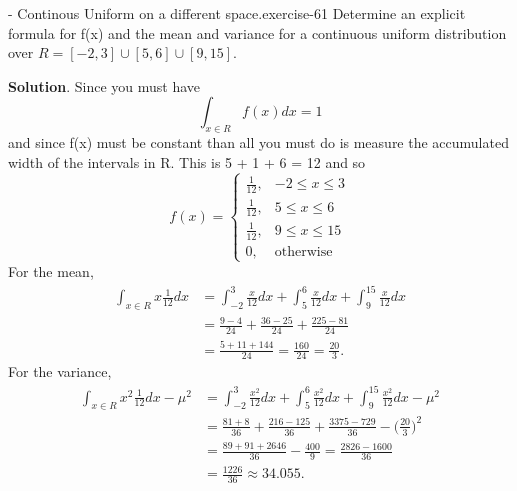\documentclass[10pt,]{book}
\numberwithin{equation}{section}
\begin{document}
%
\par
\hypertarget{p-879}{}%
\begin{inlineexercise}{- Continous Uniform on a different space.}{exercise-61}%
\hypertarget{p-880}{}%
Determine an explicit formula for f(x) and the mean and variance for a continuous uniform distribution over \(R = [-2,3] \cup [5,6] \cup [9,15]\).%
\par\smallskip%
\noindent\textbf{Solution}.\hypertarget{solution-26}{}\quad%
\hypertarget{p-881}{}%
Since you must have%
\begin{equation*}
\int_{x \in R} f(x) dx = 1
\end{equation*}
and since f(x) must be constant than all you must do is measure the accumulated width of the intervals in R. This is 5 + 1 + 6 = 12 and so%
\begin{equation*}
f(x)=\left\{\begin{matrix}
\frac{1}{12}, & -2 \le x \le 3
\\ \frac{1}{12}, & 5 \le x \le 6
\\ \frac{1}{12}, & 9 \le x \le 15
\\ 0, & \text{otherwise}
\end{matrix}\right.
\end{equation*}
For the mean,%
\begin{align*}
\int_{x \in R} x \frac{1}{12} dx & = \int_{-2}^3 \frac{x}{12} dx + \int_5^6 \frac{x}{12} dx + \int_9^{15} \frac{x}{12} dx\\
& = \frac{9-4}{24} + \frac{36-25}{24} + \frac{225-81}{24}\\
& = \frac{5+11+144}{24} = \frac{160}{24} = \frac{20}{3}.
\end{align*}
For the variance,%
\begin{align*}
\int_{x \in R} x^2 \frac{1}{12} dx - \mu^2 & = \int_{-2}^3 \frac{x^2}{12} dx + \int_5^6 \frac{x^2}{12} dx + \int_9^{15} \frac{x^2}{12} dx - \mu^2\\
& = \frac{81+8}{36} + \frac{216-125}{36} + \frac{3375-729}{36} - \big ( \frac{20}{3} \big )^2\\
& = \frac{89+91+2646}{36} - \frac{400}{9} = \frac{2826-1600}{36} \\
& = \frac{1226}{36} \approx	34.055.
\end{align*}
%
\end{inlineexercise}
%
\par
\hypertarget{p-882}{}%
\end{document}
